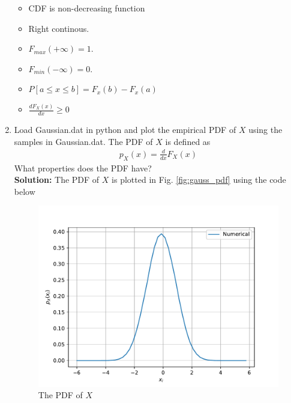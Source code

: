 \documentclass[12pt]{book}
\newcommand{\solution}{\noindent \textbf{Solution: }}
\begin{document}
\begin{enumerate}
\begin{itemize}
\item CDF is non-decreasing function 
\item Right continous.
\item $F_{max}(+\infty)=1$.
\item $F_{min}(-\infty)=0$.
\item $P[{a \leq x \leq b}] =F_{x}(b)-F_{x}(a) $
\item { $\frac{dF_X(x)}{dx} \ge 0$}
\end{itemize}
\item
Load Gaussian.dat in python and plot the empirical PDF of $X$ using the samples in Gaussian.dat. The PDF of $X$ is defined as
\begin{align}
p_{X}(x) = \frac{d}{dx}F_{X}(x)
\end{align}
What properties does the PDF have?
\\
\solution The PDF of $X$ is plotted in Fig. \ref{fig:gauss_pdf} using the code below
\begin{figure}[H]
\centering
\includegraphics[width=\columnwidth]{./figs/2/2.2.3.pdf}
\caption{The PDF of $X$}
\label{fig:gaus_pdf}
\end{figure}
\begin{center}
\end{center}
\end{enumerate}
\end{document}
